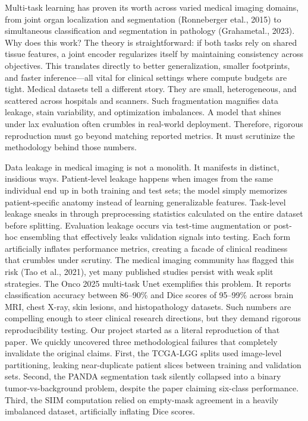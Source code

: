 \documentclass[conference,a4paper]{IEEEtran}
\begin{document}
Multi-task learning has proven its worth across varied medical imaging domains, from joint organ localization and segmentation (Ronneberger etal., 2015) to simultaneous classification and segmentation in pathology (Grahametal., 2023). Why does this work? The theory is straightforward: if both tasks rely on shared tissue features, a joint encoder regularizes itself by maintaining consistency across objectives. This translates directly to better generalization, smaller footprints, and faster inference—all vital for clinical settings where compute budgets are tight. Medical datasets tell a different story. They are small, heterogeneous, and scattered across hospitals and scanners. Such fragmentation magnifies data leakage, stain variability, and optimization imbalances. A model that shines under lax evaluation often crumbles in real-world deployment. Therefore, rigorous reproduction must go beyond matching reported metrics. It must scrutinize the methodology behind those numbers.

Data leakage in medical imaging is not a monolith. It manifests in distinct, insidious ways. Patient-level leakage happens when images from the same individual end up in both training and test sets; the model simply memorizes patient-specific anatomy instead of learning generalizable features. Task-level leakage sneaks in through preprocessing statistics calculated on the entire dataset before splitting. Evaluation leakage occurs via test-time augmentation or post-hoc ensembling that effectively leaks validation signals into testing. Each form artificially inflates performance metrics, creating a facade of clinical readiness that crumbles under scrutiny. The medical imaging community has flagged this risk (Tao et al., 2021), yet many published studies persist with weak split strategies. The Onco 2025 multi-task Unet exemplifies this problem. It reports classification accuracy between 86--90\% and Dice scores of 95--99\% across brain MRI, chest X-ray, skin lesions, and histopathology datasets. Such numbers are compelling enough to steer clinical research directions, but they demand rigorous reproducibility testing. Our project started as a literal reproduction of that paper. We quickly uncovered three methodological failures that completely invalidate the original claims. First, the TCGA-LGG splits used image-level partitioning, leaking near-duplicate patient slices between training and validation sets. Second, the PANDA segmentation task silently collapsed into a binary tumor-vs-background problem, despite the paper claiming six-class performance. Third, the SIIM computation relied on empty-mask agreement in a heavily imbalanced dataset, artificially inflating Dice scores.
\end{document}
